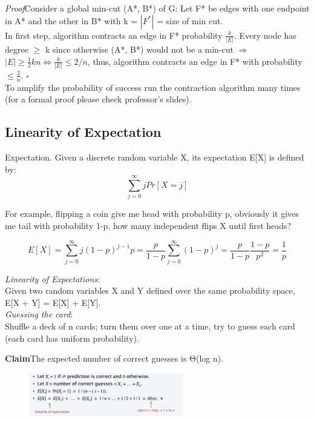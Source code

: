 \documentclass[11pt]{article}
\newenvironment{claim}[1]{\par\textbf{Claim}\space#1}{}
\newenvironment{proof}[1]{\par\textit{Proof}\space#1}{\hfill\ensuremath{\square}}
\begin{document}
\begin{proof}
Consider a global min-cut (A*, B*) of G: Let F* be edges with one endpoint in A* and the other in B* with k = $| F^{*} |$ = size of min cut.\\
In first step, algorithm contracts an edge in F* probability $\frac{k}{| E |}$. Every node has degree $\geq$ k since otherwise (A*, B*) would not be a min-cut $\Rightarrow$ $| E | \geq \frac{1}{2} k n ⇔ \frac{k}{| E |} \leq 2 / n$, thus, algorithm contracts an edge in F* with probability $\leq \frac{2}{n}$.
\end{proof}\\

To amplify the probability of success run the contraction algorithm many times (for a formal proof please check professor's slides).

\subsection{Linearity of Expectation}

Expectation. Given a discrete random variable X, its expectation E[X] is defined by:
\[\sum_{j=0} ^{\infty}j Pr[X=j]\]

For example, flipping a coin give me head with probability p, obviously it gives me tail with probability 1-p, how many independent flips X until first heads?

\[E[X] = \sum_{j=0} ^{\infty}j (1-p)^{j-1}p = \frac{p}{1-p} \sum_{j=0} ^{\infty} (1-p)^{j} = \frac{p}{1-p} \frac{1-p}{p^{2}} = \frac{1}{p} \]

\emph{Linearity of Expectations}:\\
Given two random variables X and Y defined over the same probability space, E[X + Y] = E[X] + E[Y].\\

\emph{Guessing the card}:\\
Shuffle a deck of n cards; turn them over one at a time, try to guess each card (each card has uniform probability).\\

\begin{claim}
The expected number of correct guesses is Θ(log n).
\end{claim}\\

\begin{figure}[H]
		\centering
		\includegraphics[width=0.6\textwidth ]{card}
\end{figure}
\end{document}
